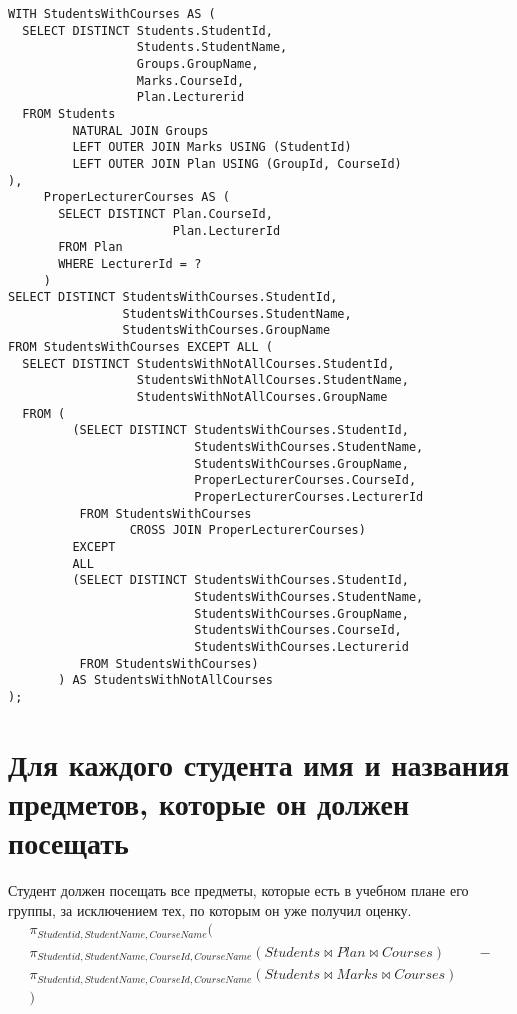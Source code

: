 \documentclass{article}
\begin{document}
\begin{verbatim}
WITH StudentsWithCourses AS (
  SELECT DISTINCT Students.StudentId,
                  Students.StudentName,
                  Groups.GroupName,
                  Marks.CourseId,
                  Plan.Lecturerid
  FROM Students
         NATURAL JOIN Groups
         LEFT OUTER JOIN Marks USING (StudentId)
         LEFT OUTER JOIN Plan USING (GroupId, CourseId)
),
     ProperLecturerCourses AS (
       SELECT DISTINCT Plan.CourseId,
                       Plan.LecturerId
       FROM Plan
       WHERE LecturerId = ?
     )
SELECT DISTINCT StudentsWithCourses.StudentId,
                StudentsWithCourses.StudentName,
                StudentsWithCourses.GroupName
FROM StudentsWithCourses EXCEPT ALL (
  SELECT DISTINCT StudentsWithNotAllCourses.StudentId,
                  StudentsWithNotAllCourses.StudentName,
                  StudentsWithNotAllCourses.GroupName
  FROM (
         (SELECT DISTINCT StudentsWithCourses.StudentId,
                          StudentsWithCourses.StudentName,
                          StudentsWithCourses.GroupName,
                          ProperLecturerCourses.CourseId,
                          ProperLecturerCourses.LecturerId
          FROM StudentsWithCourses
                 CROSS JOIN ProperLecturerCourses)
         EXCEPT
         ALL
         (SELECT DISTINCT StudentsWithCourses.StudentId,
                          StudentsWithCourses.StudentName,
                          StudentsWithCourses.GroupName,
                          StudentsWithCourses.CourseId,
                          StudentsWithCourses.Lecturerid
          FROM StudentsWithCourses)
       ) AS StudentsWithNotAllCourses
);
\end{verbatim}

	\section{Для каждого студента имя и названия предметов, которые он должен посещать}
		Студент должен посещать все предметы, которые есть в учебном плане его группы, за исключением тех, по которым он уже получил оценку.
		\begin{align*}
		\pi_{Studentid, StudentName, CourseName} (\\
		\pi_{Studentid, StudentName, CourseId, CourseName}(Students \bowtie Plan \bowtie Courses) && -\\
		\pi_{Studentid, StudentName, CourseId, CourseName}(Students \bowtie Marks \bowtie Courses)\\
		)
		\end{align*}
\end{document}

